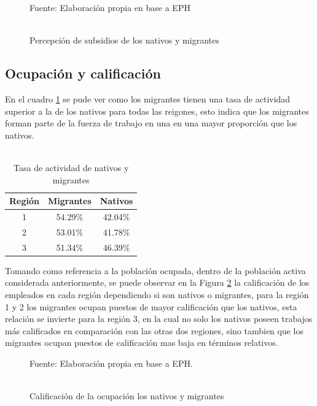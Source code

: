 \documentclass[12pt,a4paper]{article}
\begin{document}
\begin{figure}[ht!]
\begin{center}
\caption{\\Percepción de subsidios de los nativos y migrantes}
\label{figure:subsidio_mig}
 
\end{center}
\begin{flushleft}
\begin{scriptsize}
Fuente: Elaboración propia en base a EPH
\end{scriptsize}
\end{flushleft}
\end{figure}

\subsection{Ocupación y calificación}
En el cuadro \ref{cuadro:tasaactiv_mig} se pude ver como los migrantes tienen una tasa de actividad superior a la de los nativos para todas las reigones, esto indica que los migrantes forman parte de la fuerza de trabajo en una en una mayor proporción que los nativos.
\begin{table}[ht]
\centering
\caption{\\Tasa de actividad de nativos y migrantes} 
\begin{tabular}{ccc}
  \hline
 Región & Migrantes & Nativos \\ 
  \hline
   1 & 54.29\% & 42.04\% \\ 
   2 & 53.01\% & 41.78\% \\ 
   3 & 51.34\% & 46.39\% \\ 
   \hline
\end{tabular}
\label{cuadro:tasaactiv_mig}
\end{table}

Tomando como referencia a la población ocupada, dentro de la población activa considerada anteriormente, se puede observar en la Figura \ref{figure:calif_mig} la calificación de los empleados en cada región dependiendo si son nativos o migrantes, para la región 1 y 2 los migrantes ocupan puestos de mayor calificación que los nativos, esta relación se invierte para la región 3, en la cual no solo los nativos poseen trabajos más calificados en comparación con las otras dos regiones, sino tambien que los migrantes ocupan puestos de calificación mas baja en términos relativos.

\begin{figure}[ht!]
\begin{center}
\caption{\\Calificación de la ocupación los nativos y migrantes}
\label{figure:calif_mig}
 
\end{center}
\begin{flushleft}
\begin{scriptsize}
Fuente: Elaboración propia en base a EPH.
\end{scriptsize}
\end{flushleft}
\end{figure}
\end{document}
